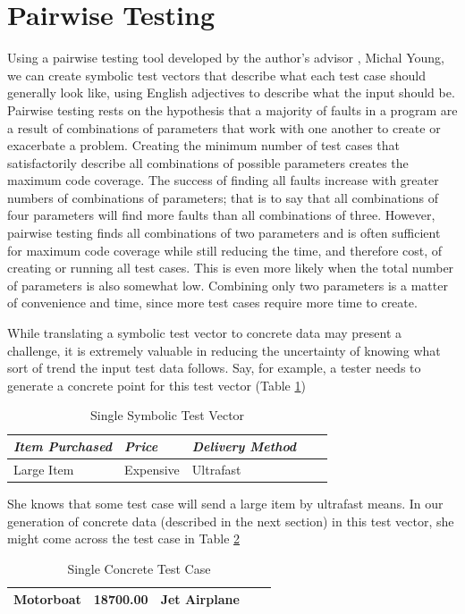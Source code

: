 \section{Pairwise Testing}
Using a pairwise testing tool developed by the author’s advisor , Michal Young, we can create symbolic test vectors that describe what each test case should generally look like, using English adjectives to describe what the input should be. Pairwise testing rests on the hypothesis that a majority of faults in a program are a result of combinations of parameters that work with one another to create or exacerbate a problem. Creating the minimum number of test cases that satisfactorily describe all combinations of possible parameters creates the maximum code coverage. The success of finding all faults increase with greater numbers of combinations of parameters; that is to say that all combinations of four parameters will find more faults than all combinations of three. However, pairwise testing finds all combinations of two parameters and is often sufficient for maximum code coverage while still reducing the time, and therefore cost, of creating or running all test cases. This is even more likely when the total number of parameters is also somewhat low. Combining only two parameters is a matter of convenience and time, since more test cases require more time to create.

While translating a symbolic test vector to concrete data may present a challenge, it is extremely valuable in reducing the uncertainty of knowing what sort of trend the input test data follows. Say, for example, a tester needs to generate a concrete point for this test vector (Table \ref{table:testv})

\begin{table}[h!]
\centering
\begin{tabular}{@{} *5l @{}}    \toprule
\emph{Item Purchased} & \emph{Price} & \emph{Delivery Method}  \\\midrule
Large Item & Expensive & Ultrafast \\\bottomrule
 \hline
\end{tabular}
\caption{Single Symbolic Test Vector}
\label{table:testv}
\end{table}

She knows that some test case will send a large item by ultrafast means. In our generation of concrete data (described in the next section) in this test vector, she might come across the test case in Table \ref{table:conctc}

\begin{table}[h!]
\centering
\begin{tabular}{@{} *5l @{}}    \toprule
Motorboat & 18700.00 & Jet Airplane \\\bottomrule
 \hline
\end{tabular}
\caption{Single Concrete Test Case}
\label{table:conctc}
\end{table}

